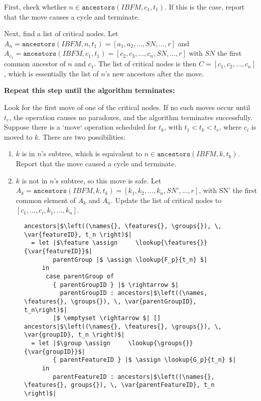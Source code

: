 First, check whether $n \in \texttt{ancestors}(IBFM, c_1, t_1)$. If this is the case, report that the move causes a cycle and terminate. 

Next, find a list of critical nodes. 
Let $A_n = \texttt{ancestors}(IBFM, n, t_1) = [a_1, a_2, \dots, SN, \dots, r]$ and $A_{c_1} = \texttt{ancestors}(IBFM, c_1, t_1) = [c_2, c_3, \dots, c_n, SN, \dots, r]$ with $SN$ the first common ancestor of $n$ and $c_1$. The list of critical nodes is then $C = [c_1, c_2, \dots, c_n]$, which is essentially the list of $n$'s new ancestors after the move. 

\textbf{Repeat this step until the algorithm terminates:}

Look for the first move of one of the critical nodes. If no such moves occur until $t_e$, the operation causes no paradoxes, and the algorithm terminates successfully.  
  Suppose there is a `move` operation scheduled for $t_k$, with $t_1 < t_k < t_e$, where $c_i$ is moved to $k$. There are two possibilities:  
  \begin{enumerate}
    \item $k$ is in $n$'s subtree, which is equivalent to $n \in \texttt{ancestors}(IBFM, k, t_k)$. Report that the move caused a cycle and terminate. 
\item $k$ is not in $n$'s subtree, so this move is safe. Let $A_k = \texttt{ancestors}(IBFM, k, t_k) = [k_1, k_2, \dots, k_n, SN', \dots, r]$, with SN' the first common element of $A_k$ and $A_n$. Update the list of critical nodes to $[c_1, \dots, c_i, k_1, \dots, k_n]$.
  \end{enumerate}

\begin{figure}[h]
  \begin{verbatim}
ancestors|$\left((\names{}, \features{}, \groups{}), \, \var{featureID}, t_n \right)$| 
  = let |$\feature \assign     \lookup{\features{}}{\var{featureID}}$|
        parentGroup |$ \assign \lookup{F_p}{t_n} $|
     in 
      case parentGroup of
        { parentGroupID } |$ \rightarrow $| 
          parentGroupID : ancestors|$\left((\names, \features{}, \groups{}), \, \var{parentGroupID}, t_n\right)$|
        |$ \emptyset \rightarrow $| []
ancestors|$\left((\names{}, \features{}, \groups{}), \, \var{groupID}, t_n \right)$| 
  = let |$\group \assign     \lookup{\groups{}}{\var{groupID}}$|
        { parentFeatureID } |$ \assign \lookup{G_p}{t_n} $|
     in 
        parentFeatureID : ancestors|$\left((\names{}, \features{}, groups{}), \, \var{parentFeatureID}, t_n \right)$| 
  \end{verbatim}
  \caption{}
  \label{fun:ancestors}
\end{figure}

